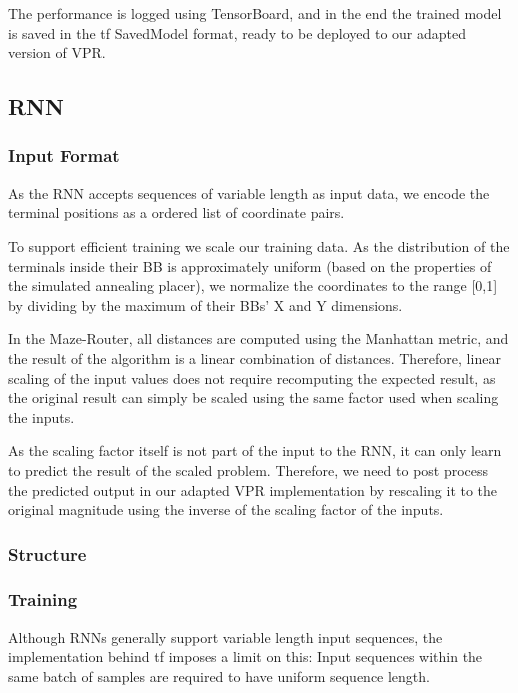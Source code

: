 The performance is logged using TensorBoard\cite{TODO}, and in the end the trained model is saved in the \gls{tf} SavedModel format\cite{TODO}, ready to be deployed to our adapted version of \gls{VPR}.

\subsection{\gls{RNN}}

\subsubsection{Input Format}

As the \gls{RNN} accepts sequences of variable length as input data, we encode the terminal positions as a ordered list of coordinate pairs.

To support efficient training we scale our training data. As the distribution of the terminals inside their \gls{BB} is approximately uniform (based on the properties of the simulated annealing placer), we normalize the coordinates to the range [0,1] by dividing by the maximum of their \glspl{BB}' X and Y dimensions. 

In the Maze-Router, all distances are computed using the Manhattan metric, and the result of the algorithm is a linear combination of distances. Therefore, linear scaling of the input values does not require recomputing the expected result, as the original result can simply be scaled using the same factor used when scaling the inputs.

As the scaling factor itself is not part of the input to the \gls{RNN}, it can only learn to predict the result of the scaled problem. Therefore, we need to post process the predicted output in our adapted \gls{VPR} implementation by rescaling it to the original magnitude using the inverse of the scaling factor of the inputs.

\subsubsection{Structure}

\subsubsection{Training}

Although \glspl{RNN} generally support variable length input sequences, the implementation behind \gls{tf} imposes a limit on this: Input sequences within the same batch of samples are required to have uniform sequence length.


